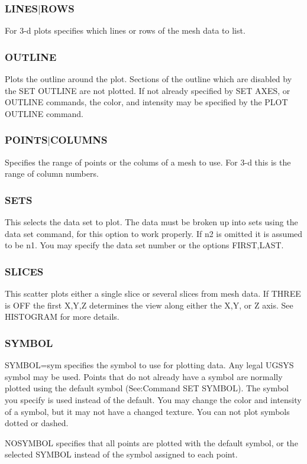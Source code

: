 \subsubsection{LINES$|$ROWS}
For 3-d plots specifies which lines or rows of the mesh data to list.  
\subsubsection{OUTLINE}
Plots  the  outline around the plot.  Sections of the outline which are
disabled by the SET OUTLINE are not plotted.  If not already  specified
by  SET AXES,  or  OUTLINE  commands,  the  color, and intensity may be
specified by the PLOT OUTLINE command.  
\subsubsection{POINTS$|$COLUMNS}
Specifies  the range of points or the colums of a mesh to use.  For 3-d
this is the range of column numbers.  
\subsubsection{SETS}
This  selects  the  data  set to plot.  The data must be broken up into
sets using the data set command, for this option to work properly.   If
n2  is  omitted  it  is assumed to be n1.  You may specify the data set
number or the options FIRST,LAST.  
\subsubsection{SLICES}
This  scatter  plots  either a single slice or several slices from mesh
data.  If THREE is OFF the first X,Y,Z determines the view along either
the X,Y, or Z axis.  See HISTOGRAM for more details.  
\subsubsection{SYMBOL}
SYMBOL=sym  specifies  the  symbol to use for plotting data.  Any legal
UGSYS symbol may be used.  Points that do not already have a symbol are
normally  plotted  using  the  default symbol (See:Command SET SYMBOL).
The symbol you specify is used instead of the default.  You may  change
the  color  and  intensity  of  a symbol, but it may not have a changed
texture.  You can not plot symbols dotted or dashed.  

NOSYMBOL specifies that all points are plotted with the default symbol,
or the selected SYMBOL instead of the symbol assigned to each point.  

